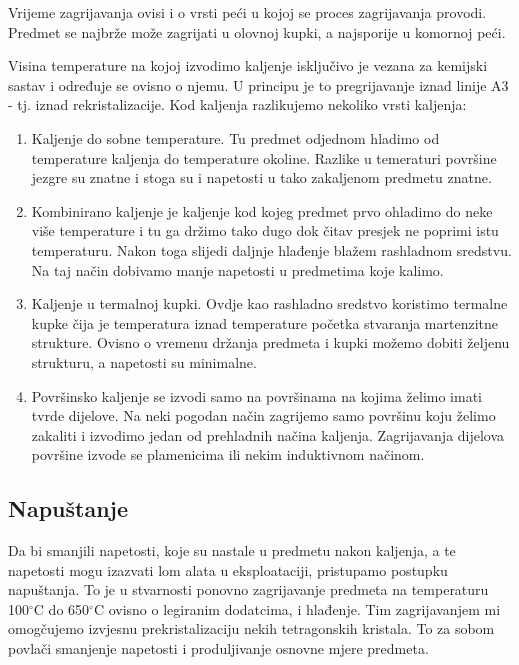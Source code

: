 \documentclass[a4paper,12pt]{article}
\numberwithin{figure}{section}
\begin{document}
Vrijeme zagrijavanja ovisi i o vrsti peći u kojoj se proces zagrijavanja provodi. Predmet se najbrže može zagrijati u olovnoj kupki, a najsporije u komornoj peći.\par
Visina temperature na kojoj izvodimo kaljenje isključivo je vezana za kemijski sastav i određuje se ovisno o njemu. U principu je to pregrijavanje iznad linije A3 - tj. iznad rekristalizacije. Kod kaljenja razlikujemo nekoliko vrsti kaljenja:
\begin{enumerate}
\item Kaljenje do sobne temperature. Tu predmet odjednom hladimo od temperature kaljenja do temperature okoline. Razlike u temeraturi površine jezgre su znatne i stoga su i napetosti u tako zakaljenom predmetu znatne.
\item Kombinirano kaljenje je kaljenje kod kojeg predmet prvo ohladimo do neke više temperature i tu ga držimo tako dugo dok čitav presjek ne poprimi istu temperaturu. Nakon toga slijedi daljnje hlađenje blažem rashladnom sredstvu. Na taj način dobivamo manje napetosti u predmetima koje kalimo.
\item Kaljenje  u termalnoj kupki. Ovdje kao rashladno sredstvo koristimo termalne kupke čija je temperatura iznad temperature početka stvaranja martenzitne strukture. Ovisno o vremenu držanja predmeta i kupki možemo dobiti željenu strukturu, a napetosti su minimalne.
\item Površinsko kaljenje se izvodi samo na površinama na kojima želimo imati tvrde dijelove. Na neki pogodan način zagrijemo samo površinu koju želimo zakaliti i izvodimo jedan od prehladnih načina kaljenja. Zagrijavanja dijelova površine izvode se plamenicima ili nekim induktivnom načinom.
\end{enumerate}
\subsection{Napuštanje}
Da bi smanjili napetosti, koje su nastale u predmetu nakon kaljenja, a te napetosti mogu izazvati lom alata u eksploataciji, pristupamo postupku napuštanja. To je u stvarnosti ponovno zagrijavanje predmeta na temperaturu 100$^{\circ}$C do 650$^{\circ}$C ovisno o legiranim dodatcima, i hlađenje. Tim zagrijavanjem mi omogčujemo izvjesnu prekristalizaciju nekih tetragonskih kristala. To za sobom povlači smanjenje napetosti i produljivanje osnovne mjere predmeta.
\end{document}
